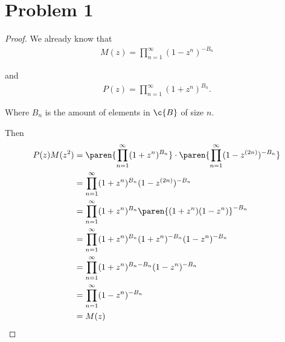 ﻿\chapter{Problem 1}

\begin{proof}
We already know that
	\begin{align}
	    M(z) = \prod_{n = 1}^\infty (1 - z^n)^{- B_n}
	\end{align}
	
	and
	\begin{align}
	    P(z) = \prod_{n = 1}^\infty (1 + z^n)^{B_n}.
	\end{align}\pn
	
	Where $B_n$ is the amount of elements in $\c{B}$ of size $n$.\pn	
	
	Then
	\begin{align}
			P(z)M(z^2) 	&=	\paren{\prod_{n = 1}^\infty (1 + z^n)^{B_n}} \cdot \paren{\prod_{n = 1}^\infty (1 - z^{(2n)})^{- B_n}}	\\
									&=	\prod_{n = 1}^\infty (1 + z^n)^{B_n} (1 - z^{(2n)})^{- B_n}																							\\
									&=	\prod_{n = 1}^\infty (1 + z^n)^{B_n} \paren{(1 + z^n)(1 - z^n)}^{- B_n}																	\\
									&=	\prod_{n = 1}^\infty (1 + z^n)^{B_n} (1 + z^n)^{- B_n} (1 - z^n)^{- B_n}																\\
									&=	\prod_{n = 1}^\infty (1 + z^n)^{B_n - B_n} (1 - z^n)^{- B_n}																						\\
									&=	\prod_{n = 1}^\infty (1 - z^n)^{- B_n}																																	\\
									&=	M(z) \qedhere
	\end{align}
\end{proof}